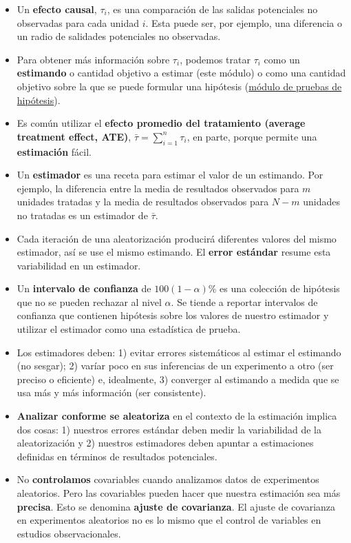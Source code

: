 \documentclass[
  12pt,
  spanish,
]{book}
\begin{document}
\begin{itemize}
\item
  Un \textbf{efecto causal}, \(\tau_i\), es una comparación de las salidas potenciales no observadas para cada unidad \(i\). Esta puede ser, por ejemplo, una diferencia o un radio de salidades potenciales no observadas.
\item
  Para obtener más información sobre \(\tau_i\), podemos tratar \(\tau_{i}\) como un \textbf{estimando} o cantidad objetivo a estimar (este módulo) o como una cantidad objetivo sobre la que se puede formular una hipótesis (\href{pruebas-de-hipótesis.html}{módulo de pruebas de hipótesis}).
\item
  Es común utilizar el \textbf{efecto promedio del tratamiento (average treatment effect, ATE)}, \(\bar{\tau} = \sum_ {i = 1}^n \tau_{i}\), en parte, porque permite una \textbf{estimación} fácil.
\item
  Un \textbf{estimador} es una receta para estimar el valor de un estimando. Por ejemplo, la diferencia entre la media de resultados observados para \(m\) unidades tratadas y la media de resultados observados para \(N-m\) unidades no tratadas es un estimador de \(\bar{\tau}\).
\item
  Cada iteración de una aleatorización producirá diferentes valores del mismo estimador, así se use el mismo estimando. El \textbf{error estándar} resume esta variabilidad en un estimador.
\item
  Un \textbf{intervalo de confianza} de \(100(1- \alpha)\)\% es una colección de hipótesis que no se pueden rechazar al nivel \(\alpha\). Se tiende a reportar intervalos de confianza que contienen hipótesis sobre los valores de nuestro estimador y utilizar el estimador como una estadística de prueba.
\item
  Los estimadores deben: 1) evitar errores sistemáticos al estimar el estimando (no sesgar); 2) varíar poco en sus inferencias de un experimento a otro (ser preciso o eficiente) e, idealmente, 3) converger al estimando a medida que se usa más y más información (ser consistente).
\item
  \textbf{Analizar conforme se aleatoriza} en el contexto de la estimación implica dos cosas: 1) nuestros errores estándar deben medir la variabilidad de la aleatorización y 2) nuestros estimadores deben apuntar a estimaciones definidas en términos de resultados potenciales.
\item
  No \textbf{controlamos} covariables cuando analizamos datos de experimentos aleatorios. Pero las covariables pueden hacer que nuestra estimación sea más \textbf{precisa}. Esto se denomina \textbf{ajuste de covarianza}. El ajuste de covarianza en experimentos aleatorios no es lo mismo que el control de variables en estudios observacionales.

\end{itemize}
\end{document}
